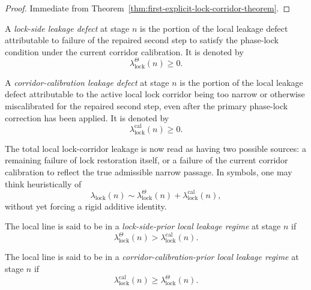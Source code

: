 \begin{proof}
Immediate from Theorem~\ref{thm:first-explicit-lock-corridor-theorem}.
\end{proof}



\begin{definition}
\label{def:lock-side-leakage-defect}
A \emph{lock-side leakage defect} at stage $n$ is the portion of the local leakage defect attributable to failure of the repaired second step to satisfy the phase-lock condition under the current corridor calibration. It is denoted by
\[
 \lambda_{\mathrm{lock}}^{\Theta}(n)\ge 0.
\]
\end{definition}

\begin{definition}
\label{def:corridor-calibration-leakage-defect}
A \emph{corridor-calibration leakage defect} at stage $n$ is the portion of the local leakage defect attributable to the active local lock corridor being too narrow or otherwise miscalibrated for the repaired second step, even after the primary phase-lock correction has been applied. It is denoted by
\[
 \lambda_{\mathrm{lock}}^{\mathrm{cal}}(n)\ge 0.
\]
\end{definition}

\begin{remark}
\label{rem:how-the-leakage-splits}
The total local lock-corridor leakage is now read as having two possible sources: a remaining failure of lock restoration itself, or a failure of the current corridor calibration to reflect the true admissible narrow passage. In symbols, one may think heuristically of
\[
 \lambda_{\mathrm{lock}}(n)
 \sim
 \lambda_{\mathrm{lock}}^{\Theta}(n)
 +
 \lambda_{\mathrm{lock}}^{\mathrm{cal}}(n),
\]
without yet forcing a rigid additive identity.
\end{remark}

\begin{definition}
\label{def:lock-side-prior-local-leakage-regime}
The local line is said to be in a \emph{lock-side-prior local leakage regime} at stage $n$ if
\[
 \lambda_{\mathrm{lock}}^{\Theta}(n)
 >
 \lambda_{\mathrm{lock}}^{\mathrm{cal}}(n).
\]
\end{definition}

\begin{definition}
\label{def:corridor-calibration-prior-local-leakage-regime}
The local line is said to be in a \emph{corridor-calibration-prior local leakage regime} at stage $n$ if
\[
 \lambda_{\mathrm{lock}}^{\mathrm{cal}}(n)
 \ge
 \lambda_{\mathrm{lock}}^{\Theta}(n).
\]
\end{definition}

